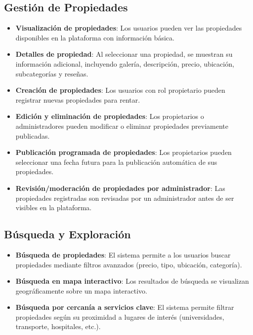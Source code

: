 	\subsection{Gestión de Propiedades}
		\begin{itemize}
			\item \textbf{Visualización de propiedades}: Los usuarios pueden ver las propiedades disponibles en la plataforma con información básica.
			\item \textbf{Detalles de propiedad}: Al seleccionar una propiedad, se muestran su información adicional, incluyendo galería, descripción, precio, ubicación, subcategorías y reseñas.
			\item \textbf{Creación de propiedades}: Los usuarios con rol propietario pueden registrar nuevas propiedades para rentar.
			\item \textbf{Edición y eliminación de propiedades}: Los propietarios o administradores pueden modificar o eliminar propiedades previamente publicadas.
			\item \textbf{Publicación programada de propiedades}: Los propietarios pueden seleccionar una fecha futura para la publicación automática de sus propiedades.
			\item \textbf{Revisión/moderación de propiedades por administrador}: Las propiedades registradas son revisadas por un administrador antes de ser visibles en la plataforma.
		\end{itemize}
	
	\subsection{Búsqueda y Exploración}
		\begin{itemize}
			\item \textbf{Búsqueda de propiedades}: El sistema permite a los usuarios buscar propiedades mediante filtros avanzados (precio, tipo, ubicación, categoría).
			\item \textbf{Búsqueda en mapa interactivo}: Los resultados de búsqueda se visualizan geográficamente sobre un mapa interactivo.
			\item \textbf{Búsqueda por cercanía a servicios clave}: El sistema permite filtrar propiedades según su proximidad a lugares de interés (universidades, transporte, hospitales, etc.).
		\end{itemize}
	
